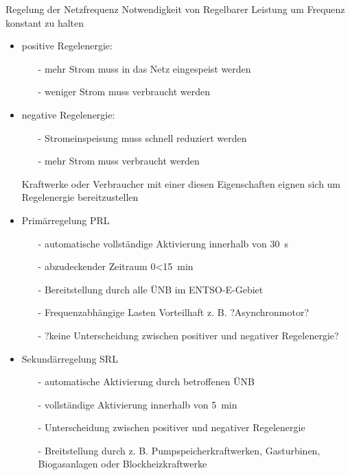 \documentclass[aspectratio=1610, professionalfonts, 9pt]{beamer}
\begin{document}
\begin{frame}{Regelung der Netzfrequenz}
Notwendigkeit von Regelbarer Leistung um Frequenz konstant zu halten
\begin{itemize}
  \item positive Regelenergie:
  \begin{itemize}
    \item[-] mehr Strom muss in das Netz eingespeist werden
    \item[-] weniger Strom muss verbraucht werden
  \end{itemize}
  \item negative Regelenergie:
  \begin{itemize}
    \item[-] Stromeinspeisung muss schnell reduziert werden
    \item[-] mehr Strom muss verbraucht werden
  \end{itemize}
  \item[\rightarrow] Kraftwerke oder Verbraucher mit einer diesen Eigenschaften eignen sich um Regelenergie bereitzustellen
\end{itemize}
\end{frame}

\begin{frame}
  \begin{itemize}
    \item Primärregelung PRL
    \begin{itemize}
      \item[-] automatische vollständige Aktivierung innerhalb von \SI{30}{\second}
      \item[-] abzudeckender Zeitraum \num{0}<\SI{15}{\minute}
      \item[-] Bereitstellung durch alle ÜNB im ENTSO-E-Gebiet
      \item[-] Frequenzabhängige Lasten Vorteilhaft z. B. ?Asynchronmotor?
      \item[-] ?keine Unterscheidung zwischen positiver und negativer Regelenergie?
    \end{itemize}
    \item Sekundärregelung SRL
    \begin{itemize}
      \item[-] automatische Aktivierung durch betroffenen ÜNB
      \item[-] vollständige Aktivierung innerhalb von \SI{5}{\minute}
      \item[-] Unterscheidung zwischen positiver und negativer Regelenergie
      \item[-] Breitstellung durch z. B. Pumpspeicherkraftwerken, Gasturbinen, Biogasanlagen oder Blockheizkraftwerke
    \end{itemize}
    \end{itemize}

\end{frame}
\end{document}
